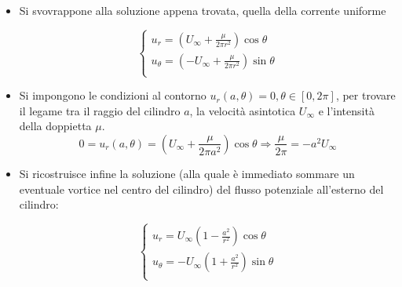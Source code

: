 \begin{itemize}
\item
Si svovrappone alla soluzione appena trovata, quella della corrente uniforme

\begin{equation}
  \begin{cases}
    u_r = \displaystyle\left( U_\infty + \frac{\mu}{2\pi r^2} \right)\cos\theta \\
    u_\theta = \displaystyle\left( - U_\infty + \frac{\mu}{2\pi r^2} \right)\sin\theta \\
  \end{cases}
\end{equation}

\item 
Si impongono le condizioni al contorno $u_r(a,\theta) = 0, \theta \in [0, 2\pi]$, per trovare il legame
tra il raggio del cilindro $a$, la velocità asintotica $U_\infty$ e l'intensità della doppietta $\mu$.
\begin{equation}
  0 = u_r(a,\theta) =  \displaystyle\left( U_\infty + \frac{\mu}{2\pi a^2} \right)\cos\theta
  \Rightarrow \frac{\mu}{2\pi} = - a^2 U_\infty 
\end{equation}

\item
Si ricostruisce infine la soluzione (alla quale è immediato sommare un eventuale vortice nel centro del cilindro) del flusso potenziale all'esterno del cilindro:

\begin{equation}
  \begin{cases}
    u_r = U_\infty \displaystyle\left(1 - \frac{a^2}{r^2}  \right)\cos\theta \\
    u_\theta = - U_\infty \displaystyle\left(1 + \frac{a^2}{r^2}  \right)\sin\theta \\
  \end{cases}
\end{equation}
\end{itemize}

